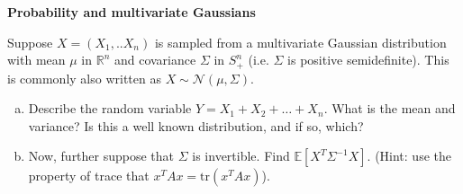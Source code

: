 \item {} \textbf{Probability and multivariate Gaussians}

  Suppose $X=(X_1,..X_n)$ is sampled from a multivariate Gaussian
  distribution with mean $\mu$ in $\mathbb{R}^n$ and covariance $\Sigma$ in $S^n_+$
  (i.e. $\Sigma$ is positive semidefinite).
  This is commonly also written as $X \sim \mathcal{N}(\mu, \Sigma)$.

  \begin{enumerate}[(a)]
  \item
  Describe the random variable $Y = X_1 + X_2 + \ldots + X_n$.
  What is the mean and variance?
  Is this a well known distribution, and if so, which?
  

  \item
  Now, further suppose that $\Sigma$ is invertible. Find $\mathbb{E}[X^T\Sigma^{-1}X]$.
  (Hint: use the property of trace that $x^TAx = \text{tr}(x^TAx)$).
  

  \end{enumerate}